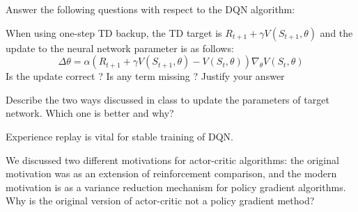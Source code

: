 \documentclass[solution,addpoints,12pt]{exam}
\begin{document}
\begin{questions}
\begin{enumerate}[label=(\alph*)]
 \end{enumerate}
 

\question[4] Answer the following questions with respect to the DQN algorithm:
\begin{itemize}
    \question [2] When using one-step TD backup, the TD target is $R_{t+1}+\gamma V(S_{t+1},\theta)$ and the update to the neural network parameter is as follows:\\
    \begin{equation}
        \Delta \theta=\alpha(R_{t+1}+\gamma V(S_{t+1},\theta)-V(S_{t},\theta))\nabla_{\theta}V(S_{t},\theta)
    \end{equation}
    Is the update correct ? Is any term missing ? Justify your answer
    \begin{solution}
    
    \end{solution}
    \question [2] Describe the two ways discussed in class to update the parameters of target network. Which one is better and why?
    \begin{solution}
    
    \end{solution}
\end{itemize}

\question[4] Experience replay is vital for stable training of DQN.

\question[3] We discussed two different motivations for actor-critic algorithms: the original motivation was as an extension of reinforcement comparison, and the modern motivation is as a variance reduction mechanism for policy gradient algorithms. Why is the original version
of actor-critic not a policy gradient method?
\begin{solution}


\end{solution}
\end{questions}
\end{document}
